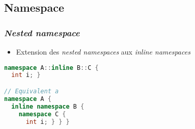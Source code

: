 \documentclass[C++.tex]{subfiles}
\begin{document}
\subsection*{Namespace}
\begin{frame}[fragile]
	\frametitle{\textit{Nested namespace}}
	\begin{itemize}
		\item Extension des \textit{nested namespaces} aux \textit{inline namespaces}
	\end{itemize}

	\begin{lstlisting}[language=C++]
namespace A::inline B::C { 
  int i; }

// Equivalent a
namespace A {
  inline namespace B {
    namespace C {
      int i; } } }\end{lstlisting}

\end{frame}
\end{document}
